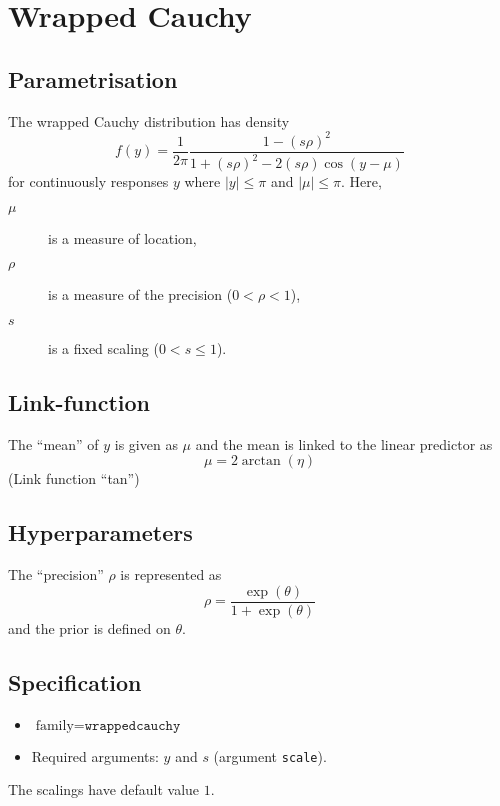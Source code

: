 \documentclass[a4paper,11pt]{article}
\begin{document}
\section*{Wrapped Cauchy}

\subsection*{Parametrisation}

The wrapped Cauchy distribution has density
\begin{displaymath}
    f(y) =\frac{1}{2\pi}\frac{1-{(s\rho)^2}}{1+(s\rho)^2-2(s\rho)\cos(y-\mu)} 
\end{displaymath}
for continuously responses $y$ where
$|y| \le \pi$ and $|\mu| \le \pi$. Here, 
\begin{description}
\item[$\mu$] is a measure of location, 
\item[$\rho$] is a measure of the precision ($0<\rho<1$),
\item[$s$] is a fixed scaling ($0<s\le1$).
\end{description}

\subsection*{Link-function}

The ``mean'' of $y$ is given as $\mu$ and the mean is linked to the
linear predictor as
\begin{displaymath}
    \mu = 2\arctan(\eta)
\end{displaymath}
(Link function ``tan'')

\subsection*{Hyperparameters}

The ``precision'' $\rho$ is represented as
\begin{displaymath}
    \rho = \frac{\exp(\theta)}{1+\exp(\theta)}
\end{displaymath}
and the prior is defined on $\theta$. 

\subsection*{Specification}

\begin{itemize}
\item $\text{family}=\texttt{wrappedcauchy}$
\item Required arguments: $y$ and $s$ (argument \texttt{scale}).
\end{itemize}
The scalings have default value $1$.
\end{document}
